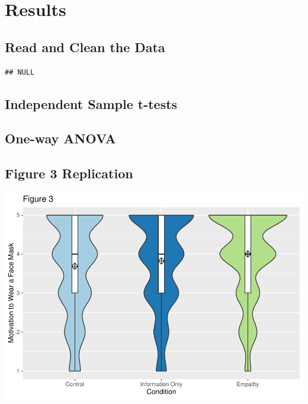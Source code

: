 \documentclass[
  english,
  man]{apa6}
\begin{document}
\newpage

\hypertarget{results}{%
\section{Results}\label{results}}

\hypertarget{read-and-clean-the-data}{%
\subsection{Read and Clean the Data}\label{read-and-clean-the-data}}

\begin{verbatim}
## NULL
\end{verbatim}

\hypertarget{independent-sample-t-tests}{%
\subsection{Independent Sample t-tests}\label{independent-sample-t-tests}}

\hypertarget{one-way-anova}{%
\subsection{One-way ANOVA}\label{one-way-anova}}

\hypertarget{figure-3-replication}{%
\subsection{Figure 3 Replication}\label{figure-3-replication}}

\includegraphics{APA_Report_files/figure-latex/unnamed-chunk-6-1.pdf}
\end{document}
